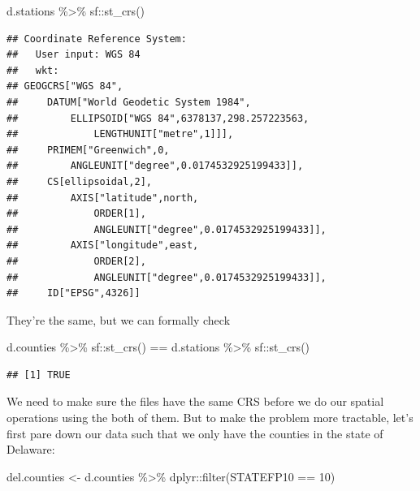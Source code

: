 \documentclass[]{article}
\newenvironment{Shaded}{\begin{snugshade}}{\end{snugshade}}
\newcommand{\DecValTok}[1]{\textcolor[rgb]{0.00,0.00,0.81}{#1}}
\newcommand{\FunctionTok}[1]{\textcolor[rgb]{0.00,0.00,0.00}{#1}}
\newcommand{\NormalTok}[1]{#1}
\newcommand{\OtherTok}[1]{\textcolor[rgb]{0.56,0.35,0.01}{#1}}
\newcommand{\SpecialCharTok}[1]{\textcolor[rgb]{0.00,0.00,0.00}{#1}}
\begin{document}
\begin{Shaded}
\begin{Highlighting}[]
\NormalTok{d.stations }\SpecialCharTok{\%\textgreater{}\%}\NormalTok{ sf}\SpecialCharTok{::}\FunctionTok{st\_crs}\NormalTok{()}
\end{Highlighting}
\end{Shaded}

\begin{verbatim}
## Coordinate Reference System:
##   User input: WGS 84 
##   wkt:
## GEOGCRS["WGS 84",
##     DATUM["World Geodetic System 1984",
##         ELLIPSOID["WGS 84",6378137,298.257223563,
##             LENGTHUNIT["metre",1]]],
##     PRIMEM["Greenwich",0,
##         ANGLEUNIT["degree",0.0174532925199433]],
##     CS[ellipsoidal,2],
##         AXIS["latitude",north,
##             ORDER[1],
##             ANGLEUNIT["degree",0.0174532925199433]],
##         AXIS["longitude",east,
##             ORDER[2],
##             ANGLEUNIT["degree",0.0174532925199433]],
##     ID["EPSG",4326]]
\end{verbatim}

They're the same, but we can formally check

\begin{Shaded}
\begin{Highlighting}[]
\NormalTok{d.counties }\SpecialCharTok{\%\textgreater{}\%}\NormalTok{ sf}\SpecialCharTok{::}\FunctionTok{st\_crs}\NormalTok{() }\SpecialCharTok{==}\NormalTok{ d.stations }\SpecialCharTok{\%\textgreater{}\%}\NormalTok{ sf}\SpecialCharTok{::}\FunctionTok{st\_crs}\NormalTok{()}
\end{Highlighting}
\end{Shaded}

\begin{verbatim}
## [1] TRUE
\end{verbatim}

We need to make sure the files have the same CRS before we do our
spatial operations using the both of them. But to make the problem more
tractable, let's first pare down our data such that we only have the
counties in the state of Delaware:

\begin{Shaded}
\begin{Highlighting}[]
\NormalTok{del.counties }\OtherTok{\textless{}{-}}\NormalTok{ d.counties }\SpecialCharTok{\%\textgreater{}\%}\NormalTok{ dplyr}\SpecialCharTok{::}\FunctionTok{filter}\NormalTok{(STATEFP10 }\SpecialCharTok{==} \DecValTok{10}\NormalTok{)}
\end{Highlighting}
\end{Shaded}
\end{document}
